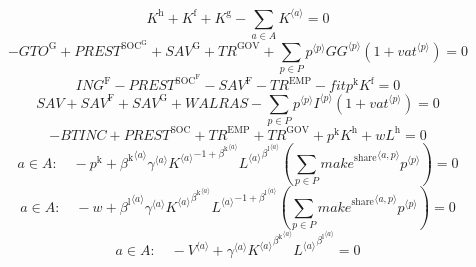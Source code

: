 \begin{equation}
K^{\mathrm{h}} + K^{\mathrm{f}} + K^{\mathrm{g}} - \sum_{a\in A} {K}^{\langle a\rangle} = 0
\end{equation}
\begin{equation}
-{G\!T\!O}^{\mathrm{G}} + {P\!R\!E\!S\!T}^{\mathrm{SOC}^{\mathrm{G}}} + {S\!A\!V}^{\mathrm{G}} + {T\!R}^{\mathrm{GOV}} + \sum_{p\in P} {{p}^{\langle p\rangle}} {{{G\!G}}^{\langle p\rangle}} \left(1 + {{v\!a\!t}}^{\langle p\rangle}\right) = 0
\end{equation}
\begin{equation}
{I\!N\!G}^{\mathrm{F}} - {P\!R\!E\!S\!T}^{\mathrm{SOC}^{\mathrm{F}}} - {S\!A\!V}^{\mathrm{F}} - {T\!R}^{\mathrm{EMP}} - {{f\!i\!t}} {p^{\mathrm{k}}} {K^{\mathrm{f}}} = 0
\end{equation}
\begin{equation}
{S\!A\!V} + {S\!A\!V}^{\mathrm{F}} + {S\!A\!V}^{\mathrm{G}} + {W\!A\!L\!R\!A\!S} - \sum_{p\in P} {{p}^{\langle p\rangle}} {{I}^{\langle p\rangle}} \left(1 + {{v\!a\!t}}^{\langle p\rangle}\right) = 0
\end{equation}
\begin{equation}
-{B\!T\!I\!N\!C} + {P\!R\!E\!S\!T}^{\mathrm{SOC}} + {T\!R}^{\mathrm{EMP}} + {T\!R}^{\mathrm{GOV}} + {p^{\mathrm{k}}} {K^{\mathrm{h}}} + {w} {L^{\mathrm{h}}} = 0
\end{equation}
\begin{equation}
a\in A\colon\quad -p^{\mathrm{k}} + {{\beta^{\mathrm{k}}}^{\langle a\rangle}} {{\gamma}^{\langle a\rangle}} {{{K}^{\langle a\rangle}}^{-1 + {\beta^{\mathrm{k}}}^{\langle a\rangle}}} {{{L}^{\langle a\rangle}}^{{\beta^{\mathrm{l}}}^{\langle a\rangle}}} \left(\sum_{p\in P} {{{m\!a\!k\!e}^{\mathrm{share}}}^{\langle a,p\rangle}} {{p}^{\langle p\rangle}}\right) = 0
\end{equation}
\begin{equation}
a\in A\colon\quad -w + {{\beta^{\mathrm{l}}}^{\langle a\rangle}} {{\gamma}^{\langle a\rangle}} {{{K}^{\langle a\rangle}}^{{\beta^{\mathrm{k}}}^{\langle a\rangle}}} {{{L}^{\langle a\rangle}}^{-1 + {\beta^{\mathrm{l}}}^{\langle a\rangle}}} \left(\sum_{p\in P} {{{m\!a\!k\!e}^{\mathrm{share}}}^{\langle a,p\rangle}} {{p}^{\langle p\rangle}}\right) = 0
\end{equation}
\begin{equation}
a\in A\colon\quad -{V}^{\langle a\rangle} + {{\gamma}^{\langle a\rangle}} {{{K}^{\langle a\rangle}}^{{\beta^{\mathrm{k}}}^{\langle a\rangle}}} {{{L}^{\langle a\rangle}}^{{\beta^{\mathrm{l}}}^{\langle a\rangle}}} = 0
\end{equation}
